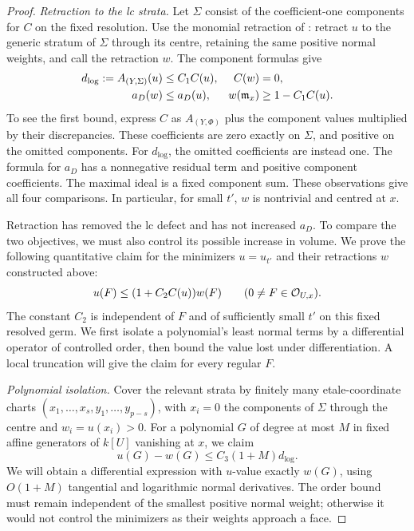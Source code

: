 \begin{proof}
\smallskip
\noindent\emph{Retraction to the lc strata.}
Let \(\Sigma\) consist of the coefficient-one components for \(C\) on
the fixed resolution. Use the monomial retraction of
\cite[Lemma~4.7 and Corollary~4.8]{JM}: retract \(u\) to the generic
stratum of \(\Sigma\)
through its centre, retaining the same positive normal weights, and
call the retraction \(w\). The component formulas give
\[
 \begin{aligned}
 d_{\log}:=A_{(Y,\Sigma)}(u)&\leq C_1C(u),&
 C(w)&=0,\\
 a_D(w)&\leq a_D(u),&
 w(\mathfrak m_x)&\geq1-C_1C(u).
 \end{aligned}
\]
To see the first bound, express \(C\) as \(A_{(Y,\Phi)}\) plus the
component values multiplied by their discrepancies. These coefficients
are zero exactly on \(\Sigma\), and positive on the omitted components.
For \(d_{\log}\), the omitted coefficients are instead one.
The formula for \(a_D\) has a nonnegative residual term and positive
component coefficients. The maximal ideal is a fixed component sum.
These observations give all four comparisons. In particular, for small
\(t'\), \(w\) is nontrivial and centred at \(x\).

Retraction has removed the lc defect and has not increased \(a_D\).
To compare the two objectives, we must also control its possible increase
in volume. We prove the following quantitative claim for the minimizers
\(u=u_{t'}\) and their retractions \(w\) constructed above:
\begin{equation}
 u(F)\leq(1+C_2C(u))w(F)
                  \qquad(0\ne F\in\mathcal O_{U,x}).
 \label{eq:A4}
\end{equation}
The constant \(C_2\) is independent of \(F\) and of sufficiently small
\(t'\) on this fixed resolved germ. We first isolate a polynomial's
least normal terms by a differential operator of controlled order, then
bound the value lost under differentiation. A local truncation will give
the claim for every regular \(F\).

\smallskip
\noindent\emph{Polynomial isolation.}
Cover the relevant strata by finitely many etale-coordinate charts
\((x_1,\ldots,x_s,y_1,\ldots,y_{p-s})\), with \(x_i=0\) the components
of \(\Sigma\) through the centre and \(w_i=u(x_i)>0\).
For a polynomial \(G\) of degree at most \(M\) in fixed affine generators
of \(k[U]\) vanishing at \(x\), we claim
\begin{equation}
                      u(G)-w(G)\leq C_3(1+M)d_{\log}.
 \label{eq:A5}
\end{equation}
We will obtain a differential expression with \(u\)-value exactly
\(w(G)\), using \(O(1+M)\) tangential and logarithmic normal
derivatives. The order bound must remain independent of the smallest
positive normal weight; otherwise it would not control the minimizers
as their weights approach a face.


\end{proof}
